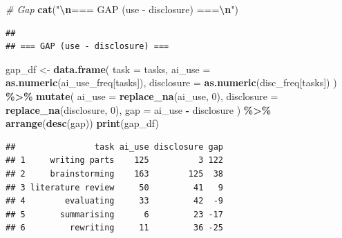 \documentclass[
]{article}
\newenvironment{Shaded}{\begin{snugshade}}{\end{snugshade}}
\newcommand{\AttributeTok}[1]{\textcolor[rgb]{0.13,0.29,0.53}{#1}}
\newcommand{\CommentTok}[1]{\textcolor[rgb]{0.56,0.35,0.01}{\textit{#1}}}
\newcommand{\DecValTok}[1]{\textcolor[rgb]{0.00,0.00,0.81}{#1}}
\newcommand{\FunctionTok}[1]{\textcolor[rgb]{0.13,0.29,0.53}{\textbf{#1}}}
\newcommand{\NormalTok}[1]{#1}
\newcommand{\OtherTok}[1]{\textcolor[rgb]{0.56,0.35,0.01}{#1}}
\newcommand{\SpecialCharTok}[1]{\textcolor[rgb]{0.81,0.36,0.00}{\textbf{#1}}}
\newcommand{\StringTok}[1]{\textcolor[rgb]{0.31,0.60,0.02}{#1}}
\begin{document}
\begin{Shaded}
\begin{Highlighting}[]
\CommentTok{\# Gap}
\FunctionTok{cat}\NormalTok{(}\StringTok{"}\SpecialCharTok{\textbackslash{}n}\StringTok{=== GAP (use {-} disclosure) ===}\SpecialCharTok{\textbackslash{}n}\StringTok{"}\NormalTok{)}
\end{Highlighting}
\end{Shaded}

\begin{verbatim}
## 
## === GAP (use - disclosure) ===
\end{verbatim}

\begin{Shaded}
\begin{Highlighting}[]
\NormalTok{gap\_df }\OtherTok{\textless{}{-}} \FunctionTok{data.frame}\NormalTok{(}
  \AttributeTok{task =}\NormalTok{ tasks,}
  \AttributeTok{ai\_use =} \FunctionTok{as.numeric}\NormalTok{(ai\_use\_freq[tasks]),}
  \AttributeTok{disclosure =} \FunctionTok{as.numeric}\NormalTok{(disc\_freq[tasks])}
\NormalTok{) }\SpecialCharTok{\%\textgreater{}\%}
  \FunctionTok{mutate}\NormalTok{(}
    \AttributeTok{ai\_use =} \FunctionTok{replace\_na}\NormalTok{(ai\_use, }\DecValTok{0}\NormalTok{),}
    \AttributeTok{disclosure =} \FunctionTok{replace\_na}\NormalTok{(disclosure, }\DecValTok{0}\NormalTok{),}
    \AttributeTok{gap =}\NormalTok{ ai\_use }\SpecialCharTok{{-}}\NormalTok{ disclosure}
\NormalTok{  ) }\SpecialCharTok{\%\textgreater{}\%}
  \FunctionTok{arrange}\NormalTok{(}\FunctionTok{desc}\NormalTok{(gap))}
\FunctionTok{print}\NormalTok{(gap\_df)}
\end{Highlighting}
\end{Shaded}

\begin{verbatim}
##                task ai_use disclosure gap
## 1     writing parts    125          3 122
## 2     brainstorming    163        125  38
## 3 literature review     50         41   9
## 4        evaluating     33         42  -9
## 5       summarising      6         23 -17
## 6         rewriting     11         36 -25
\end{verbatim}
\end{document}
